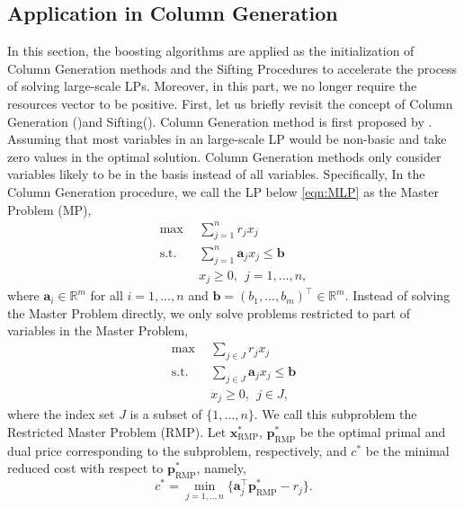 \documentclass{article} %
\newcommand{\R}{\mathbb{R}}
\begin{document}
\subsection{Application in Column Generation}
\label{sec:cg}
In this section, the boosting algorithms are applied as the initialization of Column Generation methods and the Sifting Procedures to accelerate the process of solving large-scale LPs. Moreover, in this part, we no longer require the resources vector to be positive. First, let us briefly revisit the concept of Column Generation (\cite{lubbecke2005selected})and Sifting(\cite{bixby1992very}). Column Generation method is first proposed by \cite{ford1958suggested}. Assuming that most variables in an large-scale LP would be non-basic and take zero values in the optimal solution. Column Generation methods only consider variables likely to be in the basis instead of all variables. Specifically, In the Column Generation procedure, we call the LP below \eqref{eqn:MLP} as the Master Problem (MP),
\begin{align*}
   \tag{MP} \max \ \ & \sum\limits_{j=1}^{n}r_j x_j \label{eqn:MLP}  \\
    \text{s.t. }\ & \sum\limits_{j=1}^{n}\bm{a}_j x_j \le \bm{b} \nonumber  \\ 
    & x_j \ge 0, \ \ j=1,...,n \nonumber,
\end{align*}
where $\bm{a}_i \in \R^{m}$ for all $i=1,...,n$ and $\bm{b} = (b_1,...,b_m)^{\top} \in \R^m$. Instead of solving the Master Problem directly, we only solve problems restricted to part of variables in the Master Problem,
\begin{align*}
   \tag{RMP} \max \ \ & \sum\limits_{j\in J}r_j x_j \label{eqn:RLP}  \\
    \text{s.t. }\ & \sum\limits_{j\in J}\bm{a}_j x_j \le \bm{b} \nonumber  \\ 
    & x_j \ge 0, \ \ j\in J \nonumber,
\end{align*}
where the index set $J$ is a subset of $\{1,...,n\}$. We call this subproblem the Restricted Master Problem (RMP). Let $\bm{x}_{\text{RMP}}^*$, $\bm{p}_{\text{RMP}}^*$ be the optimal primal and dual price corresponding to the subproblem, respectively, and $c^*$ be the minimal reduced cost with respect to $\bm{p}_{\text{RMP}}^*$, namely, 
$$
   c^* = \min_{j=1,..,n}\{ \bm{a}_j^{\top}\bm{p}_{\text{RMP}}^* - r_j \}.
$$
\end{document}
